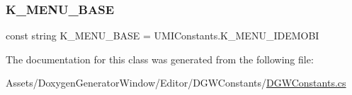 \subsubsection{\texorpdfstring{K\+\_\+\+M\+E\+N\+U\+\_\+\+B\+A\+SE}{K\_MENU\_BASE}}
{\footnotesize\ttfamily const string K\+\_\+\+M\+E\+N\+U\+\_\+\+B\+A\+SE = U\+M\+I\+Constants.\+K\+\_\+\+M\+E\+N\+U\+\_\+\+I\+D\+E\+M\+O\+BI}



The documentation for this class was generated from the following file\+:\begin{DoxyCompactItemize}
\item 
Assets/\+Doxygen\+Generator\+Window/\+Editor/\+D\+G\+W\+Constants/\hyperlink{DGWConstants_8cs}{D\+G\+W\+Constants.\+cs}\end{DoxyCompactItemize}
